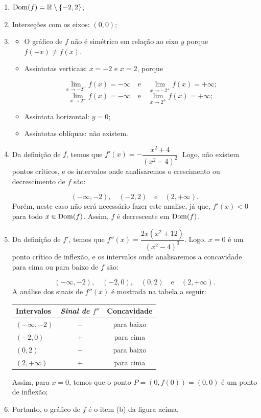 \cleardoublepage\documentclass[../main.tex]{subfiles}
\begin{document}
\begin{ex}
\begin{enumerate}[a)]
\begin{solution}
\begin{enumerate}[1.]
    \item \({\rm Dom}(f)=\mathbb{R}\setminus \{-2,2\}\);
    \item Interseções com os eixos: \((0,0)\);
    \item 
    \begin{itemize}
        \item O gráfico de \(f\) não é simétrico em relação ao eixo \(y\) porque \(f(-x)\neq f(x)\).
        \item Assíntotas verticais: \(x=-2\) e \(x=2\), porque

\[ \lim\limits_{x\to -2^-}f(x)=-\infty\quad \mbox{e}\quad \lim\limits_{x\to -2^+}f(x)=+\infty; \] \[ \lim\limits_{x\to 2^-}f(x)=-\infty\quad \mbox{e}\quad \lim\limits_{x\to 2^+}f(x)=+\infty; \]
\item Assíntota horizontal: \(y=0\);
\item Assíntotas oblíquas: não existem.
    \end{itemize}

\item Da definição de \(f\), temos que \(f'(x)= -\dfrac{x^2+4}{(x^2-4)^2}\).
Logo, não existem pontos críticos, e os intervalos onde analisaremos o crescimento ou decrescimento de \(f\) são:

\[ (-\infty,-2 ),\quad (-2,2)\quad \mbox{e}\quad (2, +\infty ). \]
Porém, neste caso não será necessário fazer este analise, já que, \(f'(x)<0\) para todo \(x \in {\rm Dom}(f)\). Assim, \(f\) é decrescente em \({\rm Dom}(f)\).
\item Da definição de \(f'\), temos que \(f''(x)= \dfrac{2x(x^2+12)}{(x^2-4)^3}\).
Logo, \(x=0\) é um ponto crítico de inflexão, e os intervalos onde analisaremos a concavidade para cima ou para baixo de \(f\) são:

\[ (-\infty,-2 ),\quad (-2,0),\quad (0,2)\quad \mbox{e}\quad (2, +\infty ). \]
A análise dos sinais de \(f''(x)\) é mostrada na tabela a seguir:
\begin{center}
  \begin{tabular}{l|c|c}
  \toprule
    \textbf{Intervalos} &	\emph{Sinal de \(f''\)} &	\textbf{Concavidade}\\\hline
\((-\infty,-2 )\)&\(-\)& para baixo\\\hline
  \((-2,0)\)& \(+\) & para cima\\\hline
  \((0,2)\) & \(-\) & para baixo\\\hline
  \((2, +\infty )\) & \(+\) & para cima\\
    \bottomrule
  \end{tabular}
  \end{center}
  Assim, para \(x=0\), temos que o ponto \(P=(0,f(0))=(0,0)\) é um ponto de inflexão;
  \item Portanto, o gráfico de \(f\) é o item (b) da figura acima.
\end{enumerate}
\end{solution}
\end{enumerate}


\end{ex}
\end{document}

